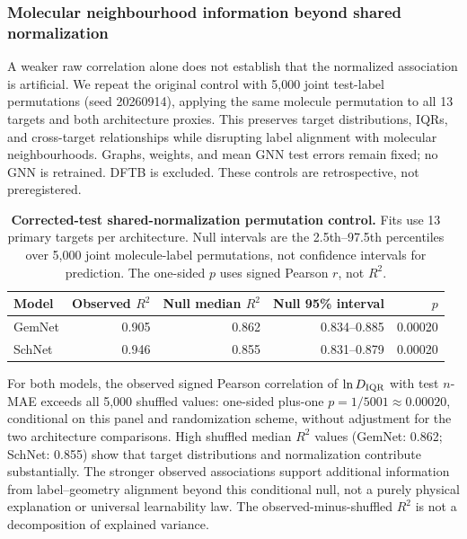\subsubsection*{Molecular neighbourhood information beyond shared normalization}
A weaker raw correlation alone does not establish that the normalized association is artificial. We repeat the original control with 5,000 joint test-label permutations (seed 20260914), applying the same molecule permutation to all 13 targets and both architecture proxies. This preserves target distributions, IQRs, and cross-target relationships while disrupting label alignment with molecular neighbourhoods. Graphs, weights, and mean GNN test errors remain fixed; no GNN is retrained. DFTB is excluded. These controls are retrospective, not preregistered.

\begin{table}[H]
\centering\small
\caption{\textbf{Corrected-test shared-normalization permutation control.} Fits use 13 primary targets per architecture. Null intervals are the 2.5th--97.5th percentiles over 5,000 joint molecule-label permutations, not confidence intervals for prediction. The one-sided $p$ uses signed Pearson $r$, not $R^2$.}
\label{tab:test-normalization-permutation}
\begin{tabular}{lrrrr}\toprule
Model & Observed $R^2$ & Null median $R^2$ & Null 95\% interval & $p$ \\
\midrule
GemNet & 0.905 & 0.862 & 0.834--0.885 & 0.00020 \\
SchNet & 0.946 & 0.855 & 0.831--0.879 & 0.00020 \\
\bottomrule\end{tabular}
\end{table}

For both models, the observed signed Pearson correlation of \(\ln D_{\rm IQR}\) with test \(n\)-MAE exceeds all 5,000 shuffled values: one-sided plus-one \(p=1/5001\approx0.00020\), conditional on this panel and randomization scheme, without adjustment for the two architecture comparisons. High shuffled median \(R^2\) values (GemNet: 0.862; SchNet: 0.855) show that target distributions and normalization contribute substantially. The stronger observed associations support additional information from label--geometry alignment beyond this conditional null, not a purely physical explanation or universal learnability law. The observed-minus-shuffled \(R^2\) is not a decomposition of explained variance.

